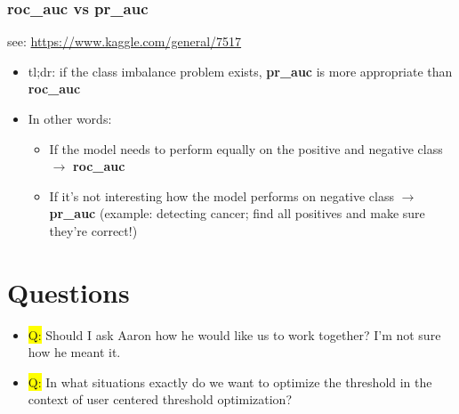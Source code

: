 \documentclass[12pt,a4paper]{article}
\begin{document}
\subsubsection{roc\_auc vs pr\_auc}
see: \url{https://www.kaggle.com/general/7517}
\begin{itemize}
\item tl;dr: if the class imbalance problem exists, \textbf{pr\_auc} is more appropriate than \textbf{roc\_auc}
\item In other words: 
\begin{itemize}
\item If the model needs to perform equally on the positive and negative class $\rightarrow$ \textbf{roc\_auc}
\item If it's not interesting how the model performs on negative class $\rightarrow$ \textbf{pr\_auc} (example: detecting cancer; find all positives and make sure they're correct!)
\end{itemize}
\end{itemize}
%
%
%
%
\section*{Questions}
\begin{itemize}
%
\item \colorbox{yellow}{Q:} Should I ask Aaron how he would like us to work together? I'm not sure how he meant it.
%
\item \colorbox{yellow}{Q:} In what situations exactly do we want to optimize the threshold in the context of user centered threshold optimization?
%
\end{itemize}
\end{document}
